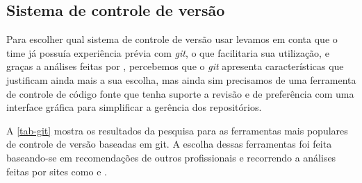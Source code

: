 \documentclass[
	12pt,				%
	openright,			%
	twoside,			%
	a4paper,			%
	english,			%
	french,				%
	spanish,			%
	brazil,				%
	]{abntex2}
\begin{document}
\subsection{Sistema de controle de versão}

Para escolher qual sistema de controle de versão usar levamos em conta que o time já possuía experiência prévia com \textit{git}, o que facilitaria sua utilização, e graças a análises feitas por , percebemos que o \textit{git} apresenta características que justificam ainda mais a sua escolha, mas ainda sim precisamos de uma ferramenta de controle de código fonte que tenha suporte a revisão e de preferência com uma interface gráfica para simplificar a gerência dos repositórios.

A \autoref{tab-git} mostra os resultados da pesquisa para as ferramentas mais populares de controle de versão baseadas em git. A escolha dessas ferramentas foi feita baseando-se em recomendações de outros profissionais e recorrendo a análises feitas por sites como  e .
\end{document}
